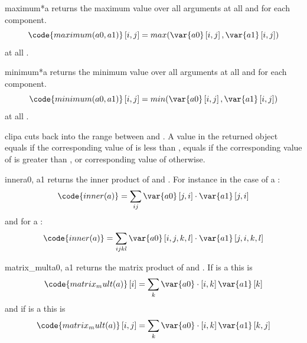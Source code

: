 \begin{funcdesc}{maximum}{*a}
returns the maximum value over all arguments at all \DataSamplePoints and for each component.
\begin{equation}
\code{maximum(a0,a1)}\left[i,j\right]=max(\var{a0} \left[i,j\right],\var{a1} \left[i,j\right])
\end{equation}
at all \DataSamplePoints.
\end{funcdesc}

\begin{funcdesc}{minimum}{*a}
returns the minimum value over all arguments at all \DataSamplePoints and for each component.
\begin{equation}
\code{minimum(a0,a1)}\left[i,j\right]=min(\var{a0} \left[i,j\right],\var{a1} \left[i,j\right])
\end{equation}
at all \DataSamplePoints.
\end{funcdesc}

\begin{funcdesc}{clip}{a}
cuts back  into the range between  and .
A value in the returned object equals  if the corresponding value
of  is less than , equals  if the corresponding
value of  is greater than , or corresponding value of
 otherwise.
\end{funcdesc}

\begin{funcdesc}{inner}{a0, a1}
returns the inner product of  and . For instance in the
case of a \RankTwo:
\begin{equation}
\code{inner(a)}=\sum_{ij}\var{a0} \left[j,i\right]  \cdot \var{a1} \left[j,i\right]
\end{equation}
and for a \RankFour:
\begin{equation}
\code{inner(a)}=\sum_{ijkl}\var{a0} \left[i,j,k,l\right]  \cdot \var{a1} \left[j,i,k,l\right]
\end{equation}
\end{funcdesc}

\begin{funcdesc}{matrix_mult}{a0, a1}
returns the matrix product of  and .
If  is a \RankOne this is
\begin{equation}
\code{matrix_mult(a)}\left[i\right]=\sum_{k}\var{a0}  \cdot \left[i,k\right]\var{a1} \left[k\right]
\end{equation}
and if  is a \RankTwo this is
\begin{equation}
\code{matrix_mult(a)}\left[i,j\right]=\sum_{k}\var{a0}  \cdot \left[i,k\right]\var{a1} \left[k,j\right]
\end{equation}
\end{funcdesc}

